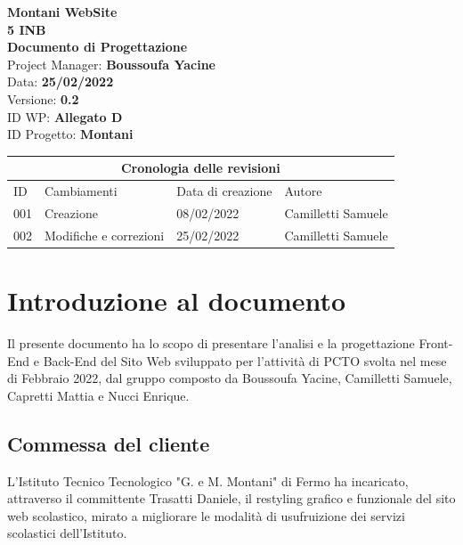 \documentclass{article}
\begin{document}
	
	
	\begin{titlepage}
		\begin{center}
			\huge\textbf{Montani WebSite}\\
			\Large\textbf{5 INB}\\
			\Large \textbf{Documento di Progettazione}\\
			\vspace{4cm}
			\large Project Manager: \textbf{Boussoufa Yacine}\\
			\large Data: \textbf{25/02/2022}\\
			\large Versione: \textbf{0.2}\\
			\large ID WP: \textbf{Allegato D}\\
			\large ID Progetto: \textbf{Montani}\\
			
		\end{center}
	\end{titlepage}
	
	\clearpage
	
	\begin{tabular}{ |p{1cm}|p{4cm}|p{3cm}|p{2cm}|  }
		\hline
		\multicolumn{4}{|c|}{Cronologia delle revisioni} \\
		\hline
		ID& Cambiamenti &Data di creazione&Autore\\
		\hline
		001   & Creazione    &08/02/2022&   Camilletti Samuele\\
		\hline
		002   & Modifiche e correzioni    &25/02/2022&   Camilletti Samuele\\
		\hline
	\end{tabular}
	
	\clearpage
	
	\tableofcontents
	\printindex	
	
   

	\section{\textbf{Introduzione al documento}}
	\flushleft
	\normalsize
	Il presente documento ha lo scopo di presentare l'analisi e la progettazione Front-End e Back-End del Sito Web sviluppato per l'attività di PCTO svolta nel mese di Febbraio 2022, dal gruppo composto da Boussoufa Yacine, Camilletti Samuele, Capretti Mattia e Nucci Enrique.
	\normalsize
	\subsection{\textbf{Commessa del cliente}} 
	\flushleft
	\normalsize
	L'Istituto Tecnico Tecnologico "G. e M. Montani" di Fermo ha incaricato, attraverso il committente Trasatti Daniele, il restyling grafico e funzionale del sito web scolastico, mirato a migliorare le modalità di usufruizione dei servizi scolastici dell'Istituto.
\end{document}
